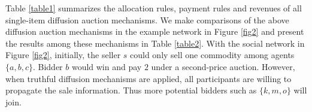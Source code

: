 \documentclass{article}
\newtheorem{example}{Example}
\begin{document}
Table \ref{table1} summarizes the allocation rules, payment rules and revenues of all single-item diffusion auction mechanisms. We make comparisons of the above diffusion auction mechanisms in the example network in Figure \ref{fig2} and present the results among these mechanisms in Table \ref{table2}. With the social network in Figure \ref{fig2}, initially, the seller $s$ could only sell one commodity among agents $\{a,b,c\}$. Bidder $b$ would win and pay $2$ under a second-price auction. However, when truthful diffusion mechanisms are applied, all participants are willing to propagate the sale information. Thus more potential bidders such as $\{k,m,o\}$ will join. 
\end{document}
